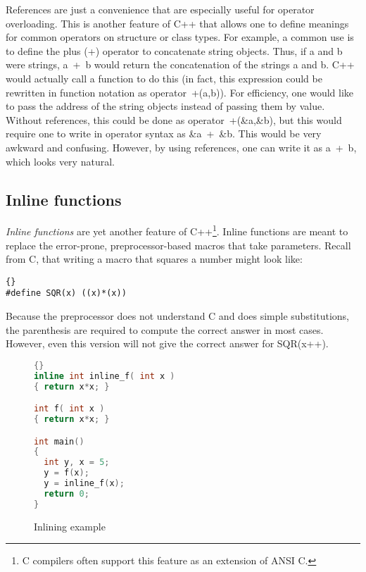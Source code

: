 References are just a convenience that are especially useful for
operator overloading. This is another feature of C++ that allows one
to define meanings for common operators on structure or class
types. For example, a common use is to define the plus ({\code +})
operator to concatenate string objects. Thus, if {\code a} and {\code
b} were strings, {\code a~+~b} would return the concatenation of the
strings {\code a} and {\code b}. C++ would actually call a function to
do this (in fact, this expression could be rewritten in function
notation as {\code operator~+(a,b)}).  For efficiency, one would like
to pass the address of the string objects instead of passing them by
value. Without references, this could be done as {\code 
operator~+(\&a,\&b)}, but this would require one to write in operator
syntax as {\code \&a~+~\&b}. This would be very awkward and confusing.
However, by using references, one can write it as {\code a~+~b}, which
looks very natural.

\subsection{Inline functions}

\emph{Inline functions} are yet another feature of C++\footnote{
C compilers often support this feature as an extension
of ANSI C.}. Inline functions are meant to replace the error-prone,
preprocessor-based macros that take parameters. Recall from C, that
writing a macro that squares a number might look like:
\begin{lstlisting}[stepnumber=0]{}
#define SQR(x) ((x)*(x))
\end{lstlisting}
\noindent Because the preprocessor does not understand C and does
simple substitutions, the parenthesis are required to compute the correct
answer in most cases. However, even this version will not give the correct
answer for {\code SQR(x++)}.

\begin{figure}
\begin{lstlisting}[language=C++,frame=tlrb]{}
inline int inline_f( int x ) 
{ return x*x; }

int f( int x ) 
{ return x*x; }

int main()
{
  int y, x = 5;
  y = f(x);
  y = inline_f(x);
  return 0;
}
\end{lstlisting}
\caption{Inlining example \label{fig:InlineFun}}
\end{figure}


